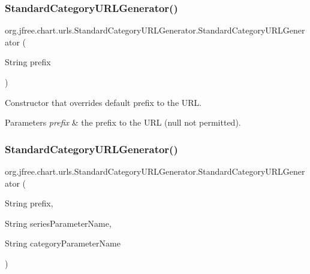 \subsubsection{\texorpdfstring{Standard\+Category\+U\+R\+L\+Generator()}{StandardCategoryURLGenerator()}\hspace{0.1cm}{\footnotesize\ttfamily [2/3]}}
{\footnotesize\ttfamily org.\+jfree.\+chart.\+urls.\+Standard\+Category\+U\+R\+L\+Generator.\+Standard\+Category\+U\+R\+L\+Generator (\begin{DoxyParamCaption}\item[{String}]{prefix }\end{DoxyParamCaption})}

Constructor that overrides default prefix to the U\+RL.


\begin{DoxyParams}{Parameters}
{\em prefix} & the prefix to the U\+RL ({\ttfamily null} not permitted). \\
\hline
\end{DoxyParams}
\mbox{\label{classorg_1_1jfree_1_1chart_1_1urls_1_1_standard_category_u_r_l_generator_a4f2910f6ce783766e491e93650e0c572}} 
\subsubsection{\texorpdfstring{Standard\+Category\+U\+R\+L\+Generator()}{StandardCategoryURLGenerator()}\hspace{0.1cm}{\footnotesize\ttfamily [3/3]}}
{\footnotesize\ttfamily org.\+jfree.\+chart.\+urls.\+Standard\+Category\+U\+R\+L\+Generator.\+Standard\+Category\+U\+R\+L\+Generator (\begin{DoxyParamCaption}\item[{String}]{prefix,  }\item[{String}]{series\+Parameter\+Name,  }\item[{String}]{category\+Parameter\+Name }\end{DoxyParamCaption})}

